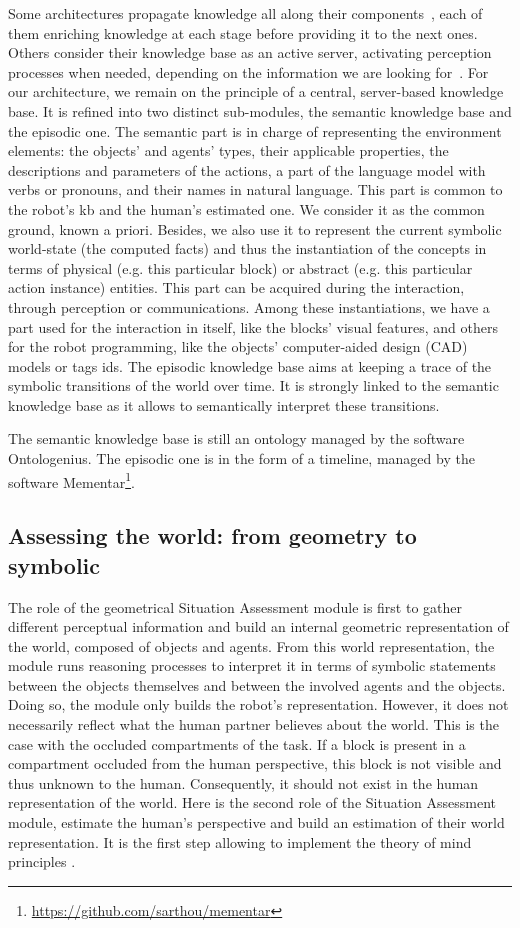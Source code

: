 Some architectures propagate knowledge all along their components~\cite{hawes_2007_balt}, each of them enriching knowledge at each stage before providing it to the next ones. Others consider their knowledge base as an active server, activating perception processes when needed, depending on the information we are looking for~\cite{beetz_2018_know}. For our architecture, we remain on the principle of a central, server-based knowledge base. It is refined into two distinct sub-modules, the semantic knowledge base and the episodic one. The semantic part is in charge of representing the environment elements: the objects' and agents' types, their applicable properties, the descriptions and parameters of the actions, a part of the language model with verbs or pronouns, and their names in natural language. This part is common to the robot's \acrlong{kb} and the human's estimated one. We consider it as the common ground, known a priori. Besides, we also use it to represent the current symbolic world-state (the computed facts) and thus the instantiation of the concepts in terms of physical (e.g. this particular block) or abstract (e.g. this particular action instance) entities. This part can be acquired during the interaction, through perception or communications. Among these instantiations, we have a part used for the interaction in itself, like the blocks' visual features, and others for the robot programming, like the objects' computer-aided design (CAD) models or tags ids. The episodic knowledge base aims at keeping a trace of the symbolic transitions of the world over time. It is strongly linked to the semantic knowledge base as it allows to semantically interpret these transitions. 

The semantic knowledge base is still an ontology managed by the software Ontologenius. The episodic one is in the form of a timeline, managed by the software Mementar\footnote{\url{https://github.com/sarthou/mementar}}.

\subsection{Assessing the world: from geometry to symbolic}

The role of the geometrical Situation Assessment module is first to gather different perceptual information and build an internal geometric representation of the world, composed of objects and agents. From this world representation, the module runs reasoning processes to interpret it in terms of symbolic statements between the objects themselves and between the involved agents and the objects. Doing so, the module only builds the robot's representation. However, it does not necessarily reflect what the human partner believes about the world. This is the case with the occluded compartments of the task. If a block is present in a compartment occluded from the human perspective, this block is not visible and thus unknown to the human. Consequently, it should not exist in the human representation of the world. Here is the second role of the Situation Assessment module, estimate the human's perspective and build an estimation of their world representation. It is the first step allowing to implement the theory of mind principles \cite{baron_1985_does}.

